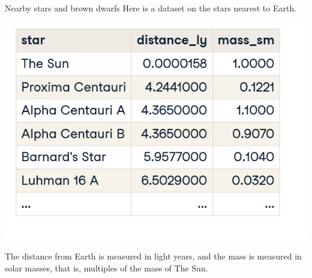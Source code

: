 \documentclass[
  ignorenonframetext,
]{beamer}
\begin{document}
\begin{frame}{Nearby stars and brown dwarfs}
\label{nearby-stars-and-brown-dwarfs}
Here is a dataset on the stars nearest to Earth.

\includegraphics{../images/im58.png}

The distance from Earth is measured in light years, and the mass is
measured in solar masses, that is, multiples of the mass of The Sun.
\end{frame}
\end{document}
